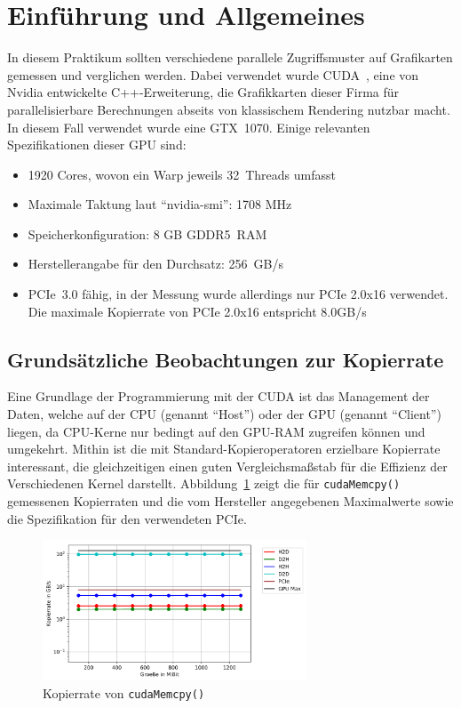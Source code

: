 \documentclass[11pt, abstract=on]{scrartcl}
\begin{document}
\lstset{language=[11]C++}   

\section{Einführung und Allgemeines}
In diesem Praktikum sollten verschiedene parallele Zugriffsmuster auf Grafikarten gemessen und verglichen werden. Dabei verwendet wurde CUDA~\cite{CUDA}, eine von Nvidia entwickelte C++-Erweiterung, die Grafikkarten dieser Firma für parallelisierbare Berechnungen abseits von klassischem Rendering nutzbar macht. In diesem Fall verwendet wurde eine GTX~1070. Einige relevanten Spezifikationen dieser GPU sind:
\begin{itemize}
	\item 1920 Cores, wovon ein Warp jeweils 32~Threads umfasst~\cite{GPUSpecs}
	\item Maximale Taktung laut "`nvidia-smi"': 1708 MHz~\cite{GPUSpecs}
	\item Speicherkonfiguration: 8 GB GDDR5~RAM~\cite{GPUSpecs}
	\item Herstellerangabe für den Durchsatz: 256~GB/s~\cite{GPUSpecs}
	\item PCIe~3.0 fähig, in der Messung wurde allerdings nur PCIe 2.0x16 verwendet. Die maximale Kopierrate von PCIe 2.0x16 entspricht 8.0GB/s~\cite{PCIeSpecs}
\end{itemize}


\subsection{Grundsätzliche Beobachtungen zur Kopierrate}
Eine Grundlage der Programmierung mit der CUDA ist das Management der Daten, welche auf der CPU (genannt "`Host"') oder der GPU (genannt "`Client"') liegen, da CPU-Kerne nur bedingt auf den GPU-RAM zugreifen können und umgekehrt. Mithin ist die mit Standard-Kopieroperatoren erzielbare Kopierrate interessant, die gleichzeitigen einen guten Vergleichsmaßstab für die Effizienz der Verschiedenen Kernel darstellt. Abbildung~\ref{fig:Kopierrate} zeigt die für \texttt{cudaMemcpy()} gemessenen Kopierraten und die vom Hersteller angegebenen Maximalwerte sowie die Spezifikation für den verwendeten PCIe.

\begin{figure} [htbp]
 	\centering
 		\includegraphics[width=0.7\textwidth]{Graph_Kopierrate.png}
 	\caption{Kopierrate von \texttt{cudaMemcpy()}}
 	\label{fig:Kopierrate}
\end{figure}
\end{document}

